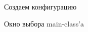 \documentclass[12pt, a4paper]{article}
\begin{document}
    
    \begin{multicols}{2}[]
        \begin{figure}[H]
            \caption{Создаем конфигурацию}
        \end{figure}
        \columnbreak
        \begin{figure}[H]
            \caption{Окно выбора main-class'a}
        \end{figure}
    \end{multicols}
\end{document}
